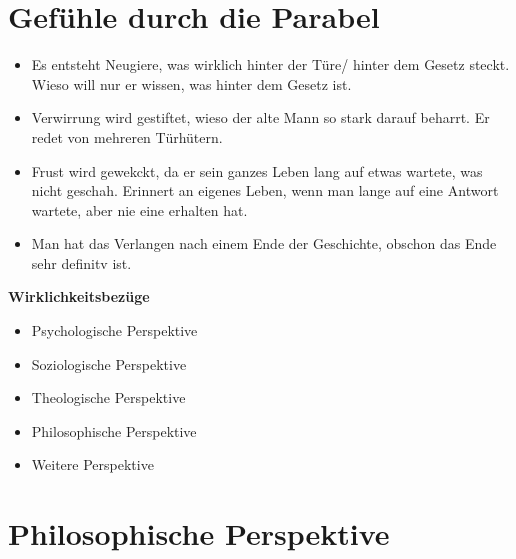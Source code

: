 \documentclass{article}
\begin{document}
\section{Gefühle durch die Parabel}
\begin{itemize}[parsep=0pt]
    \item Es entsteht Neugiere, was wirklich hinter der Türe/ hinter dem Gesetz steckt. Wieso will nur er wissen, was hinter dem Gesetz ist.
    \item Verwirrung wird gestiftet, wieso der alte Mann so stark darauf beharrt. Er redet von mehreren Türhütern.
    \item Frust wird gewekckt, da er sein ganzes Leben lang auf etwas wartete, was nicht geschah. Erinnert an eigenes Leben, wenn man lange auf eine Antwort wartete, aber nie eine erhalten hat.
    \item Man hat das Verlangen nach einem Ende der Geschichte, obschon das Ende sehr definitv ist.
\end{itemize}

\textbf{Wirklichkeitsbezüge}

\begin{itemize}
    \item Psychologische Perspektive
    \item Soziologische Perspektive
    \item Theologische Perspektive
    \item Philosophische Perspektive
    \item Weitere Perspektive
\end{itemize}

\section{Philosophische Perspektive}
\end{document}
